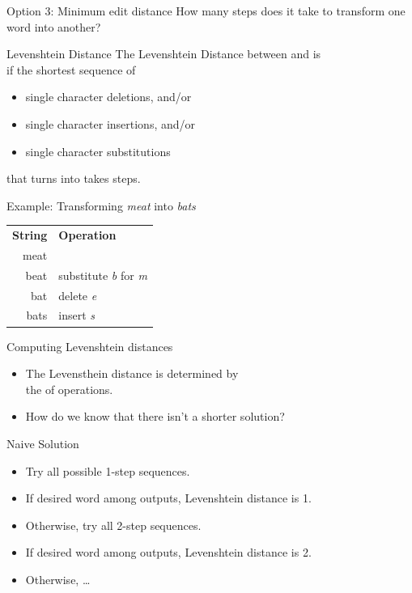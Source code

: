 \documentclass[professionalfonts, xcolor={usenames,svgnames,x11names,table}]{beamer}
\begin{document}
\begin{frame}{Option 3: Minimum edit distance}
    How many steps does it take to transform one word into another?
    \begin{block}{Levenshtein Distance}
        The Levenshtein Distance between  and  is \\
        if the shortest sequence of
        \begin{itemize}
            \item single character deletions, and\slash or
            \item single character insertions, and\slash or
            \item single character substitutions
        \end{itemize}
        that turns  into  takes  steps.
    \end{block}
    \begin{exampleblock}{Example: Transforming \emph{meat} into \emph{bats}}
        \centering
        \begin{tabular}{rl}
            \textbf{String} & \textbf{Operation}\\
            meat & \\
            beat & substitute \emph{b} for \emph{m}\\
            bat  & delete \emph{e}\\
            bats & insert \emph{s}
        \end{tabular}
    \end{exampleblock}
\end{frame}

\begin{frame}{Computing Levenshtein distances}
    \begin{itemize}
        \item The Levensthein distance is determined by\\
              the  of operations.
        \item How do we know that there isn't a shorter solution?
    \end{itemize}    

    \begin{block}{Naive Solution}
        \begin{itemize}
            \item Try all possible 1-step sequences.
            \item If desired word among outputs, Levenshtein distance is 1.
            \item Otherwise, try all 2-step sequences.
            \item If desired word among outputs, Levenshtein distance is 2.
            \item Otherwise, \ldots
        \end{itemize}
    \end{block}
\end{frame}
\end{document}
